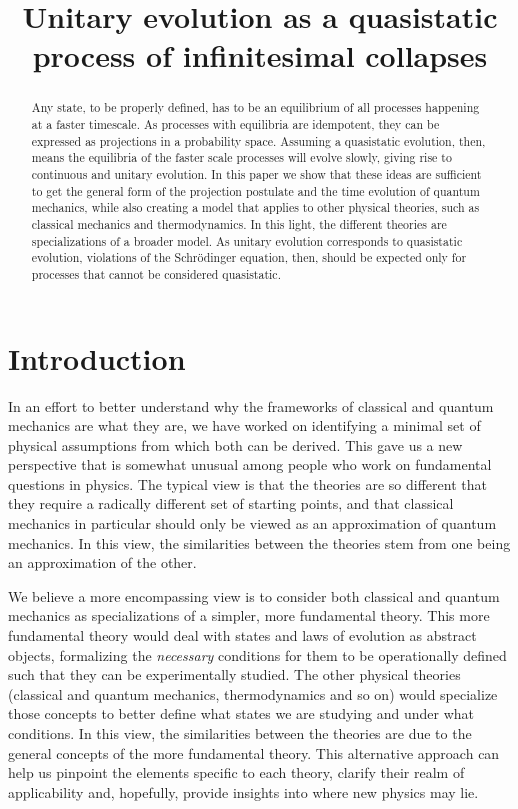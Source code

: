 \documentclass[11pt]{article}
\begin{document}
\title{Unitary evolution as a quasistatic process of infinitesimal collapses}

\maketitle

\begin{abstract}
Any state, to be properly defined, has to be an equilibrium of all processes happening at a faster timescale. As processes with equilibria are idempotent, they can be expressed as projections in a probability space. Assuming a quasistatic evolution, then, means the equilibria of the faster scale processes will evolve slowly, giving rise to continuous and unitary evolution. In this paper we show that these ideas are sufficient to get the general form of the projection postulate and the time evolution of quantum mechanics, while also creating a model that applies to other physical theories, such as classical mechanics and thermodynamics. In this light, the different theories are specializations of a broader model. As unitary evolution corresponds to quasistatic evolution, violations of the Schr\"{o}dinger equation, then, should be expected only for processes that cannot be considered quasistatic.
\end{abstract}


\section{Introduction}

In an effort to better understand why the frameworks of classical and quantum mechanics are what they are, we have worked on identifying a minimal set of physical assumptions from which both can be derived.\cite{Carc1} This gave us a new perspective that is somewhat unusual among people who work on fundamental questions in physics. The typical view is that the theories are so different that they require a radically different set of starting points, and that classical mechanics in particular should only be viewed as an approximation of quantum mechanics. In this view, the similarities between the theories stem from one being an approximation of the other.

We believe a more encompassing view is to consider both classical and quantum mechanics as specializations of a simpler, more fundamental theory. This more fundamental theory would deal with states and laws of evolution as abstract objects, formalizing the \emph{necessary} conditions for them to be operationally defined such that they can be experimentally studied. The other physical theories (classical and quantum mechanics, thermodynamics and so on) would specialize those concepts to better define what states we are studying and under what conditions. In this view, the similarities between the theories are due to the general concepts of the more fundamental theory. This alternative approach can help us pinpoint the elements specific to each theory, clarify their realm of applicability and, hopefully, provide insights into where new physics may lie.
\end{document}
